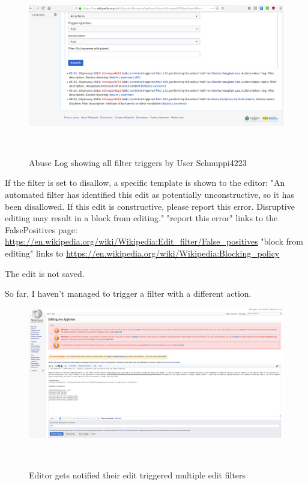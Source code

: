 \documentclass{sigchi}
\begin{document}
\begin{figure}
\centering
  \includegraphics[width=0.9\columnwidth]{figures/screenshots-filter-trigger/Screenshot-abuse-log.png}
  \caption{Abuse Log showing all filter triggers by User Schnuppi4223}~\label{fig:screenshot-abuse-log}
\end{figure}

If the filter is set to disallow, a specific template is shown to the editor: "An automated filter has identified this edit as potentially unconstructive, so it has been disallowed. If this edit is constructive, please report this error. Disruptive editing may result in a block from editing."
"report this error" links to the FalsePositives page: \url{https://en.wikipedia.org/wiki/Wikipedia:Edit_filter/False_positives}
"block from editing" links to \url{https://en.wikipedia.org/wiki/Wikipedia:Blocking_policy}

The edit is not saved.

So far, I haven't managed to trigger a filter with a different action.

\begin{figure}
\centering
  \includegraphics[width=0.9\columnwidth]{figures/screenshots-filter-trigger/Screenshot-trigger-warning-filter.png}
  \caption{Editor gets notified their edit triggered multiple edit filters}~\label{fig:screenshot-warn-disallow}
\end{figure}
\end{document}
